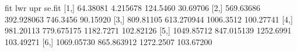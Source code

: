 \begin{Schunk}
\begin{Soutput}
            fit        lwr       upr    se.fit
[1,]   64.38081   4.215678  124.5460  30.69706
[2,]  569.63686 392.928063  746.3456  90.15920
[3,]  809.81105 613.270944 1006.3512 100.27741
[4,]  981.20113 779.675175 1182.7271 102.82126
[5,] 1049.85712 847.015139 1252.6991 103.49271
[6,] 1069.05730 865.863912 1272.2507 103.67200
\end{Soutput}
\end{Schunk}

